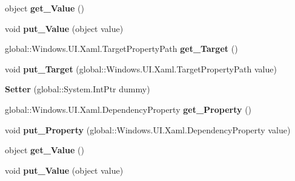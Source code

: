 \begin{DoxyCompactItemize}
object {\bfseries get\+\_\+\+Value} ()
\item 
\mbox{\label{class_windows_1_1_u_i_1_1_xaml_1_1_setter_aa1b1137b1463b4c0fcf2698f1ef38332}} 
void {\bfseries put\+\_\+\+Value} (object value)
\item 
\mbox{\label{class_windows_1_1_u_i_1_1_xaml_1_1_setter_a354e09225c55d9bc08796200969e6dbc}} 
global\+::\+Windows.\+U\+I.\+Xaml.\+Target\+Property\+Path {\bfseries get\+\_\+\+Target} ()
\item 
\mbox{\label{class_windows_1_1_u_i_1_1_xaml_1_1_setter_a625ef62aa1e630e8cfe82e287e278cb2}} 
void {\bfseries put\+\_\+\+Target} (global\+::\+Windows.\+U\+I.\+Xaml.\+Target\+Property\+Path value)
\item 
\mbox{\label{class_windows_1_1_u_i_1_1_xaml_1_1_setter_a8afe01be4ca04014f678f20627344902}} 
{\bfseries Setter} (global\+::\+System.\+Int\+Ptr dummy)
\item 
\mbox{\label{class_windows_1_1_u_i_1_1_xaml_1_1_setter_a686887dcaf21b9a12cd491564e78b429}} 
global\+::\+Windows.\+U\+I.\+Xaml.\+Dependency\+Property {\bfseries get\+\_\+\+Property} ()
\item 
\mbox{\label{class_windows_1_1_u_i_1_1_xaml_1_1_setter_ab6f14c994bdff627cc05c2de84c4e918}} 
void {\bfseries put\+\_\+\+Property} (global\+::\+Windows.\+U\+I.\+Xaml.\+Dependency\+Property value)
\item 
\mbox{\label{class_windows_1_1_u_i_1_1_xaml_1_1_setter_a36e13b544319d51446f95fa1d4f99345}} 
object {\bfseries get\+\_\+\+Value} ()
\item 
\mbox{\label{class_windows_1_1_u_i_1_1_xaml_1_1_setter_aa1b1137b1463b4c0fcf2698f1ef38332}} 
void {\bfseries put\+\_\+\+Value} (object value)
\item 
\mbox{\label{class_windows_1_1_u_i_1_1_xaml_1_1_setter_a354e09225c55d9bc08796200969e6dbc}} 

\end{DoxyCompactItemize}
